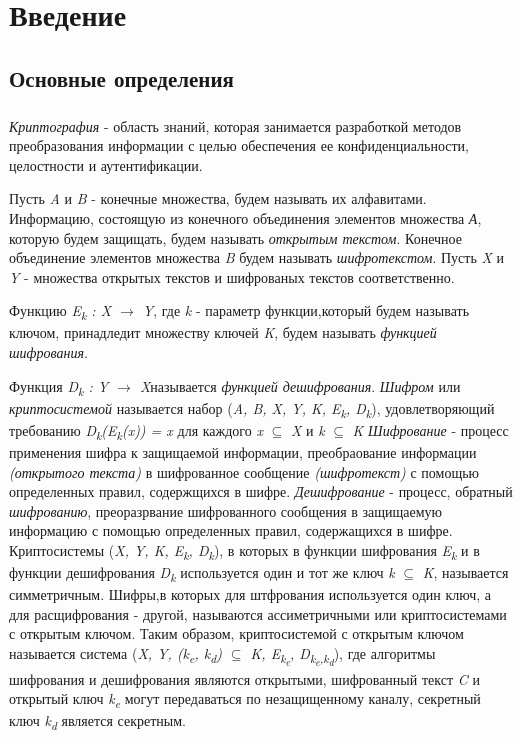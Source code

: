 \newpage
\chapter{Введение}

\section{Основные определения}
\paragraph{} \textit{Криптография} - область знаний, которая занимается разработкой методов преобразования информации с целью обеспечения ее 
конфиденциальности, целостности и аутентификации.

  Пусть \textit{A} и \textit{B}  - конечные множества, будем называть их алфавитами. Информацию, состоящую из конечного объединения элементов 
множества \textit{А}, которую будем защищать, будем называть \textit{открытым текстом}. Конечное объединение элементов множества \textit{B} будем 
называть \textit{шифротекстом}. Пусть \textit{X} и \textit{Y} - множества открытых текстов и шифрованых текстов соответственно.

  Функцию \textit{E\textsubscript{k} : \textit{X} {$\rightarrow$} \textit{Y}}, где \textit{k} - параметр функции,который будем называть ключом, 
принадледит множеству ключей \textit{K}, будем называть \textit{функцией шифрования}. 

  Функция \textit{D\textsubscript{k} : \textit{Y} {$\rightarrow$} \textit{X}}называется \textit{функцией дешифрования}.
  \textit{Шифром} или \textit{криптосистемой} называется набор (\textit{A, B, X, Y, K, E\textsubscript{k}, D\textsubscript{k}}), удовлетворяющий 
требованию \textit{D\textsubscript{k}(E\textsubscript{k}(x)) = x} для каждого \textit{x} {$\subseteq$} \textit{X} и \textit{k} {$\subseteq$} \textit{K}
  \textit{Шифрование} - процесс применения шифра к защищаемой информации, преобраование информации \textit{(открытого текста)} в шифрованное сообщение 
\textit{(шифротекст)} с помощью определенных правил, содержщихся в шифре.
  \textit{Дешифрование} - процесс, обратный \textit{шифрованию}, преоразрвание шифрованного сообщения в защищаемую информацию с помощью определенных 
правил, содержащихся в шифре.
  Криптосистемы (\textit{X, Y, K, E\textsubscript{k}, D\textsubscript{k}}), в которых в функции шифрования \textit{E\textsubscript{k}} и в функции 
дешифрования \textit{D\textsubscript{k}} используется один и тот же ключ \textit{k} {$\subseteq$} \textit{K}, называется симметричным. Шифры,в которых 
для штфрования используется один ключ, а для расщифрования - другой, называются ассиметричными или криптосистемами с открытым ключом. Таким образом, 
криптосистемой с открытым ключом называется система (\textit{X, Y, (k\textsubscript{e}, k\textsubscript{d}) {$\subseteq$} K, E\textsubscript{k\textsubscript{e}}, D\textsubscript{k\textsubscript{e},k\textsubscript{d}}}), 
где алгоритмы шифрования и дешифрования являются открытыми, шифрованный текст \textit{C} и открытый ключ \textit{k\textsubscript{e}} могут 
передаваться по незащищенному каналу, секретный ключ \textit{k\textsubscript{d}} является секретным.


